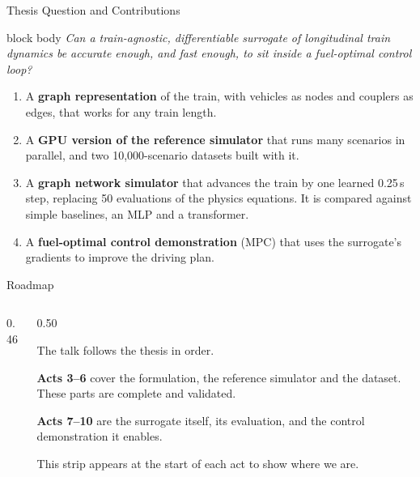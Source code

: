 \begin{frame}{Thesis Question and Contributions}
  \vspace{0.2em}
  \begin{beamercolorbox}[wd=\textwidth,sep=8pt]{block body}
    \centering\itshape
    Can a train-agnostic, differentiable surrogate of longitudinal train
    dynamics be accurate enough, and fast enough, to sit inside a fuel-optimal
    control loop?
  \end{beamercolorbox}

  \vspace{0.8em}
  \begin{enumerate}\setlength\itemsep{0.45em}
    \item A \textbf{graph representation} of the train, with vehicles as nodes
          and couplers as edges, that works for any train length.
    \item A \textbf{GPU version of the reference simulator} that runs many
          scenarios in parallel, and two 10,000-scenario datasets built with it.
    \item A \textbf{graph network simulator} that advances the train by one
          learned 0.25\,s step, replacing 50 evaluations of the physics
          equations. It is compared against simple baselines, an MLP and a
          transformer.
    \item A \textbf{fuel-optimal control demonstration} (MPC) that uses the
          surrogate's gradients to improve the driving plan.
  \end{enumerate}
\end{frame}

\begin{frame}{Roadmap}
  \vspace{0.4em}
  \begin{columns}[T,onlytextwidth]
    \begin{column}{0.46\textwidth}
      \centering
    \end{column}
    \begin{column}{0.50\textwidth}
      \vspace{1.2em}
      {\small
      The talk follows the thesis in order.

      \vspace{0.9em}
      \textbf{Acts 3--6} cover the formulation, the reference simulator and the
      dataset. These parts are complete and validated.

      \vspace{0.9em}
      \textbf{Acts 7--10} are the surrogate itself, its evaluation, and the
      control demonstration it enables.

      \vspace{0.9em}
      This strip appears at the start of each act to show where we are.}
    \end{column}
  \end{columns}
\end{frame}
